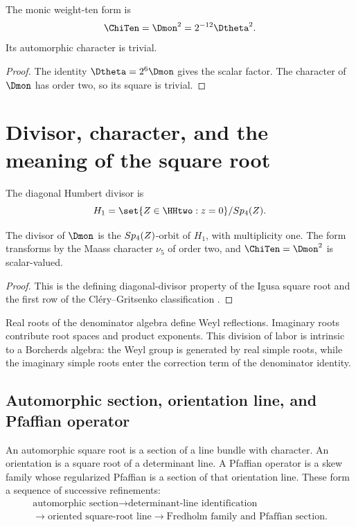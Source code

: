 \begin{corollary}
The monic weight-ten form is
\[
 \ChiTen=\Dmon^2=2^{-12}\Dtheta^2.
\]
Its automorphic character is trivial.
\end{corollary}
\begin{proof}
The identity $\Dtheta=2^6\Dmon$ gives the scalar factor.  The character of $\Dmon$ has order two, so its square is trivial.
\end{proof}

\chapter{Divisor, character, and the meaning of the square root}
The diagonal Humbert divisor is
\[
 H_1=\set{Z\in\HHtwo:z=0}/\operatorname{Sp}_4(\Z).
\]

\begin{theorem}
The divisor of $\Dmon$ is the $Sp_4(Z)$-orbit of $H_1$, with multiplicity one. The form transforms by the Maass character $\nu_5$ of order two, and $\ChiTen=\Dmon^2$ is scalar-valued.
\end{theorem}
\begin{proof}
This is the defining diagonal-divisor property of the Igusa square root and the first row of the Cl\'ery--Gritsenko classification \cite{Igusa62,Igusa64,GC}.
\end{proof}

Real roots of the denominator algebra define Weyl reflections. Imaginary roots contribute root spaces and product exponents. This division of labor is intrinsic to a Borcherds algebra: the Weyl group is generated by real simple roots, while the imaginary simple roots enter the correction term of the denominator identity.

\section{Automorphic section, orientation line, and Pfaffian operator}
An automorphic square root is a section of a line bundle with character. An orientation is a square root of a determinant line. A Pfaffian operator is a skew family whose regularized Pfaffian is a section of that orientation line. These form a sequence of successive refinements:
\[
\begin{gathered}
 \text{automorphic section}
 \longrightarrow \text{determinant-line identification}\\
 \longrightarrow \text{oriented square-root line}
 \longrightarrow \text{Fredholm family and Pfaffian section}.
\end{gathered}
\]

